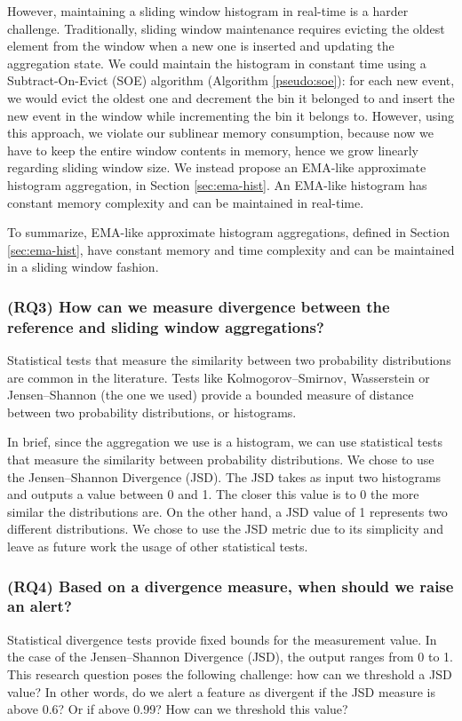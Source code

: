 However, maintaining a sliding window histogram in real-time is a harder challenge. Traditionally, sliding window maintenance requires evicting the oldest element from the window when a new one is inserted and updating the aggregation state. We could maintain the histogram in constant time using a Subtract-On-Evict (SOE) algorithm (Algorithm \ref{pseudo:soe}): for each new event, we would evict the oldest one and decrement the bin it belonged to and insert the new event in the window while incrementing the bin it belongs to. However, using this approach, we violate our sublinear memory consumption, because now we have to keep the entire window contents in memory, hence we grow linearly regarding sliding window size. We instead propose an EMA-like approximate histogram aggregation, in Section \ref{sec:ema-hist}. An EMA-like histogram has constant memory complexity and can be maintained in real-time.

To summarize, EMA-like approximate histogram aggregations, defined in Section \ref{sec:ema-hist}, have constant memory and time complexity and can be maintained in a sliding window fashion.

\subsubsection*{(RQ3) How can we measure divergence between the reference and sliding window aggregations?}
Statistical tests that measure the similarity between two probability distributions are common in the literature. Tests like Kolmogorov–Smirnov, Wasserstein or Jensen–Shannon (the one we used) provide a bounded measure of distance between two probability distributions, or histograms. 

In brief, since the aggregation we use is a histogram, we can use statistical tests that measure the similarity between probability distributions. We chose to use the Jensen–Shannon Divergence (JSD). The JSD takes as input two histograms and outputs a value between 0 and 1. The closer this value is to 0 the more similar the distributions are. On the other hand, a JSD value of 1 represents two different distributions. We chose to use the JSD metric due to its simplicity and leave as future work the usage of other statistical tests.


\subsubsection*{(RQ4) Based on a divergence measure, when should we raise an alert?}
Statistical divergence tests provide fixed bounds for the measurement value. In the case of the Jensen–Shannon Divergence (JSD), the output ranges from 0 to 1. This research question poses the following challenge: how can we threshold a JSD value? In other words, do we alert a feature as divergent if the JSD measure is above 0.6? Or if above 0.99? How can we threshold this value?

